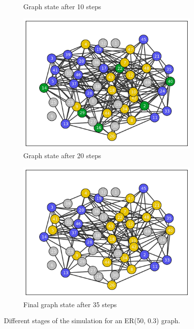 \documentclass[11pt]{article} %
\begin{document}
\begin{figure}[tbp]
\begin{subfigure}[b]{0.5\textwidth}
    \caption{Graph state after 10 steps}
  \end{subfigure}
  \begin{subfigure}[b]{0.5\textwidth}
    \centering
    \includegraphics[width=\textwidth]{figures/evo_ER_50_03_20}
    \caption{Graph state after 20 steps}
  \end{subfigure}
  \begin{subfigure}[b]{0.5\textwidth}
    \centering
    \includegraphics[width=\textwidth]{figures/evo_ER_50_03_final}
    \caption{Final graph state after 35 steps}
  \end{subfigure}
  \caption{Different stages of the simulation for an ER(50, 0.3) graph.}
  \label{fig:er_graph_evo}
\end{figure}
\end{document}
